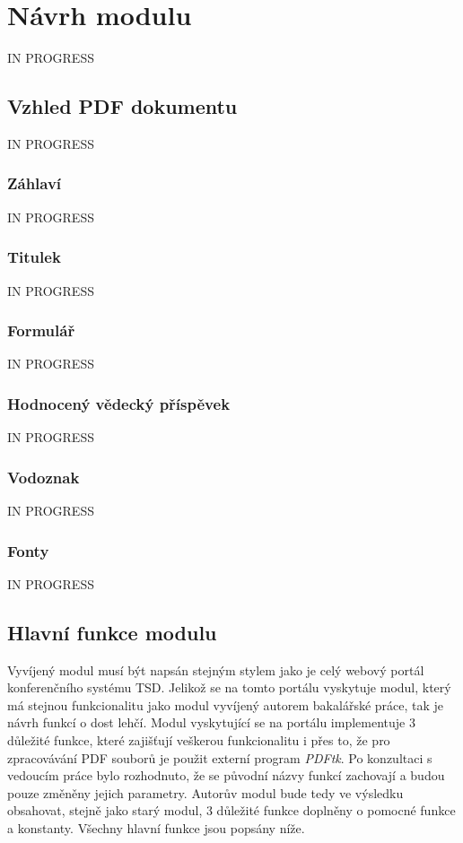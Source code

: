 \chapter{Návrh modulu}
IN PROGRESS

\section{Vzhled PDF dokumentu}
\label{navrh_vzhledu}
IN PROGRESS

\subsection{Záhlaví}
IN PROGRESS

\subsection{Titulek}
IN PROGRESS

\subsection{Formulář}
IN PROGRESS

\subsection{Hodnocený vědecký příspěvek}
IN PROGRESS

\subsection{Vodoznak}
IN PROGRESS

\subsection{Fonty}
IN PROGRESS


\section{Hlavní funkce modulu}
Vyvíjený modul musí být napsán stejným stylem jako je celý webový portál konferenčního systému TSD. Jelikož se na tomto portálu vyskytuje modul, který má stejnou funkcionalitu jako modul vyvíjený autorem bakalářské práce, tak je návrh funkcí o dost lehčí. Modul vyskytující se na portálu implementuje 3 důležité funkce, které zajišťují veškerou funkcionalitu i přes to, že pro zpracovávání PDF souborů je použit externí program \textit{PDFtk}. Po konzultaci s vedoucím práce bylo rozhodnuto, že se původní názvy funkcí zachovají a budou pouze změněny jejich parametry. Autorův modul bude tedy ve výsledku obsahovat, stejně jako starý modul, 3 důležité funkce doplněny o pomocné funkce a konstanty. Všechny hlavní funkce jsou popsány níže.  

